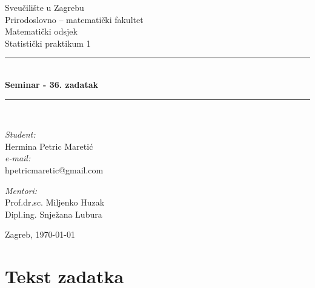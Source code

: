 \documentclass[11pt]{article}
\newcommand{\HRule}{\rule{\linewidth}{0.5mm}}
\begin{document}
\begin{titlepage}
\begin{center}

\LARGE Sveučilište u Zagrebu \\[0.5cm] Prirodoslovno -- matematički fakultet \\[0.5cm] Matematički odsjek\\[2cm]

\Large Statistički praktikum 1\\[0.5cm]

\HRule \\[0.4cm]
{ \huge \bfseries Seminar - 36. zadatak}\\[0.4cm]

\HRule \\[6.5cm]

\begin{minipage}{0.4\textwidth}
\begin{flushleft} \large
\emph{Student:\\}
Hermina Petric Maretić\\
\emph{e-mail:\\}
hpetricmaretic@gmail.com\\
\end{flushleft}
\end{minipage}
\begin{minipage}{0.4\textwidth}
\begin{flushright} \large
\emph{Mentori:\\}
Prof.dr.sc. Miljenko Huzak\\
Dipl.ing. Snježana Lubura\\
\end{flushright}
\end{minipage}


\vfill
{\large Zagreb, \today}

\end{center}
\end{titlepage}
\section*{Tekst zadatka}
\end{document}
